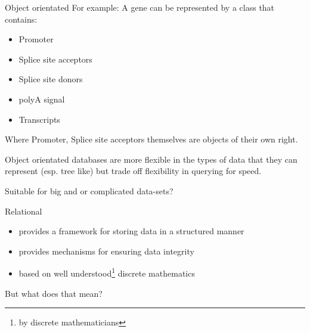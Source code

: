 \documentclass[pdf]{beamer}
\begin{document}
\begin{frame}{Object orientated}
  For example: A gene can be represented by a class that contains:
  \begin{itemize}
  \item Promoter
  \item Splice site acceptors
  \item Splice site donors
  \item polyA signal
  \item Transcripts
  \end{itemize}
  
  Where Promoter, Splice site acceptors themselves are objects of their own right.
  
  Object orientated databases are more flexible in the types of data
  that they can represent (esp. tree like) but trade off flexibility
  in querying for speed.

  Suitable for big and or complicated data-sets?
\end{frame}

\begin{frame}{Relational}
  \begin{itemize}
  \item provides a framework for storing data in a structured manner
  \item provides mechanisms for ensuring data integrity
  \item based on well understood\footnote{by discrete mathematicians} discrete mathematics
  \end{itemize}
  \pause
  But what does that mean?
\end{frame}
\end{document}
